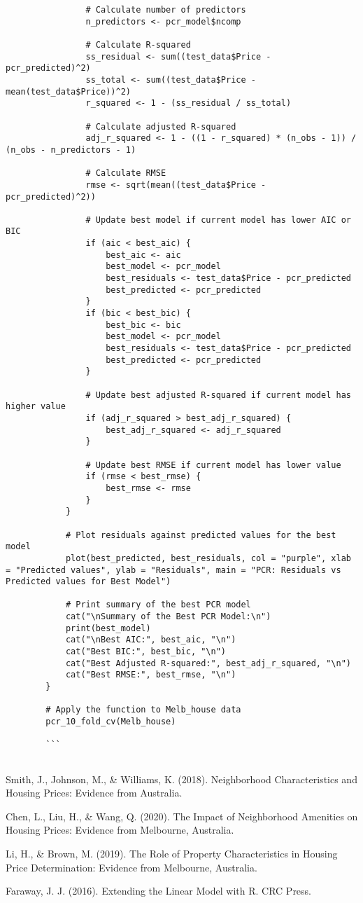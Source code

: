 \documentclass[12pt,doublespace]{article}
\begin{document}
\begin{lstlisting}
				# Calculate number of predictors
				n_predictors <- pcr_model$ncomp
				
				# Calculate R-squared
				ss_residual <- sum((test_data$Price - pcr_predicted)^2)
				ss_total <- sum((test_data$Price - mean(test_data$Price))^2)
				r_squared <- 1 - (ss_residual / ss_total)
				
				# Calculate adjusted R-squared
				adj_r_squared <- 1 - ((1 - r_squared) * (n_obs - 1)) / (n_obs - n_predictors - 1)
				
				# Calculate RMSE
				rmse <- sqrt(mean((test_data$Price - pcr_predicted)^2))
				
				# Update best model if current model has lower AIC or BIC
				if (aic < best_aic) {
					best_aic <- aic
					best_model <- pcr_model
					best_residuals <- test_data$Price - pcr_predicted
					best_predicted <- pcr_predicted
				}
				if (bic < best_bic) {
					best_bic <- bic
					best_model <- pcr_model
					best_residuals <- test_data$Price - pcr_predicted
					best_predicted <- pcr_predicted
				}
				
				# Update best adjusted R-squared if current model has higher value
				if (adj_r_squared > best_adj_r_squared) {
					best_adj_r_squared <- adj_r_squared
				}
				
				# Update best RMSE if current model has lower value
				if (rmse < best_rmse) {
					best_rmse <- rmse
				}
			}
			
			# Plot residuals against predicted values for the best model
			plot(best_predicted, best_residuals, col = "purple", xlab = "Predicted values", ylab = "Residuals", main = "PCR: Residuals vs Predicted values for Best Model")
			
			# Print summary of the best PCR model
			cat("\nSummary of the Best PCR Model:\n")
			print(best_model)
			cat("\nBest AIC:", best_aic, "\n")
			cat("Best BIC:", best_bic, "\n")
			cat("Best Adjusted R-squared:", best_adj_r_squared, "\n")
			cat("Best RMSE:", best_rmse, "\n")
		}
		
		# Apply the function to Melb_house data
		pcr_10_fold_cv(Melb_house)
		
		```
		
	\end{lstlisting}
	\clearpage
	
	\begin{thebibliography}{4}
		 Smith, J., Johnson, M., \& Williams, K. (2018). Neighborhood Characteristics and Housing Prices: Evidence from Australia.
		
		 Chen, L., Liu, H., \& Wang, Q. (2020). The Impact of Neighborhood Amenities on Housing Prices: Evidence from Melbourne, Australia.
		
		 Li, H., \& Brown, M. (2019). The Role of Property Characteristics in Housing Price Determination: Evidence from Melbourne, Australia.
		
		 Faraway, J. J. (2016). Extending the Linear Model with R. CRC Press.
	\end{thebibliography}
	
	
	
\end{document}
